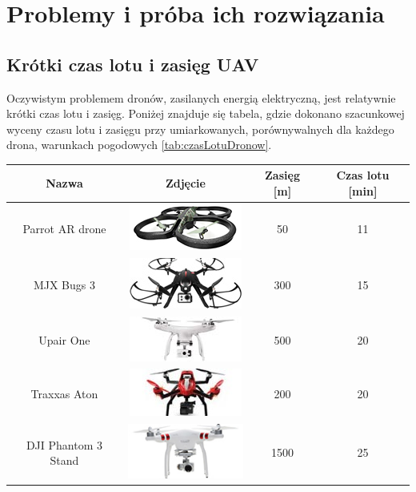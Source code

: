 \section{Problemy i próba ich rozwiązania}

\subsection{Krótki czas lotu i zasięg UAV}

Oczywistym problemem dronów, zasilanych energią elektryczną, jest relatywnie krótki czas lotu i zasięg. Poniżej znajduje się tabela, gdzie dokonano szacunkowej wyceny czasu lotu i zasięgu przy umiarkowanych, porównywalnych dla każdego drona, warunkach pogodowych \ref{tab:czasLotuDronow}.

\begin{longtable}{|c|c|c|c|} \hline
	    Nazwa & Zdjęcie & Zasięg [m] & Czas lotu [min] \\ \hline
    	    Parrot AR drone & \includegraphics{zalaczniki/obrazy/drony_miniaturki/parrot.jpg} & 50 & 11 \\ \hline
    	    MJX Bugs 3 & \includegraphics{zalaczniki/obrazy/drony_miniaturki/mjx.jpg} & 300 & 15 \\ \hline
    	    Upair One & \includegraphics{zalaczniki/obrazy/drony_miniaturki/upair.jpg} & 500 & 20 \\ \hline
    	    Traxxas Aton & \includegraphics{zalaczniki/obrazy/drony_miniaturki/TRAXXAS.jpg} & 200 & 20 \\ \hline
    	    DJI Phantom 3 Stand & \includegraphics{zalaczniki/obrazy/drony_miniaturki/dji-phantom-3-standard.jpg} & 1500 & 25 \\ \hline

\end{longtable}
